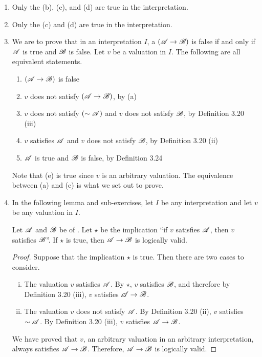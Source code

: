 \begin{enumerate}
  \item %
    Only the \wfs{} (b), (c), and (d) are true in the interpretation.

  \item %
    Only the \wfs{} (c) and (d) are true in the interpretation.

  \item %
    We are to prove that in an interpretation \(I\), a \wf{} \((\mathscr{A} \rightarrow \mathscr{B})\) is false if and only if \(\mathscr{A}\) is true and \(\mathscr{B}\) is false. Let \(v\) be a valuation in \(I\). The following are all equivalent statements.
    \begin{enumerate}[align=left]
      \item \((\mathscr{A} \rightarrow \mathscr{B})\) is false
      \item \(v\) does not satisfy \((\mathscr{A} \rightarrow \mathscr{B})\), by (a)
      \item \(v\) does not satisfy \((\sim\mathscr{A})\) and \(v\) does not satisfy \(\mathscr{B}\), by Definition 3.20 (iii)
      \item \(v\) satisfies \(\mathscr{A}\) and \(v\) does not satisfy \(\mathscr{B}\), by Definition 3.20 (ii)
      \item \(\mathscr{A}\) is true and \(\mathscr{B}\) is false, by Definition 3.24
    \end{enumerate}
    Note that (e) is true since \(v\) is an arbitrary valuation. The equivalence between (a) and (e) is what we set out to prove.

  \item %
    In the following lemma and sub-exercises, let \(I\) be any interpretation and let \(v\) be any valuation in \(I\).

    \begin{lemma*}
      Let \(\mathscr{A}\) and \(\mathscr{B}\) be \wfs{} of \cl{}. Let \(\star\) be the implication ``if \(v\) satisfies \(\mathscr{A}\), then \(v\) satisfies \(\mathscr{B}\)''. If \(\star\) is true, then \(\mathscr{A} \rightarrow \mathscr{B}\) is logically valid.

      \begin{proof}
        Suppose that the implication \(\star\) is true. Then there are two cases to consider.
        \begin{enumerate}[(i)]
          \item The valuation \(v\) satisfies \(\mathscr{A}\). By \(\star\), \(v\) satisfies \(\mathscr{B}\), and therefore by Definition 3.20 (iii), \(v\) satisfies \(\mathscr{A} \rightarrow \mathscr{B}\).
          \item The valuation \(v\) does not satisfy \(\mathscr{A}\). By Definition 3.20 (ii), \(v\) satisfies \(\sim\mathscr{A}\). By Definition 3.20 (iii), \(v\) satisfies \(\mathscr{A} \rightarrow \mathscr{B}\).
        \end{enumerate}
        We have proved that \(v\), an arbitrary valuation in an arbitrary interpretation, always satisfies \(\mathscr{A} \rightarrow \mathscr{B}\). Therefore, \(\mathscr{A} \rightarrow \mathscr{B}\) is logically valid.
      \end{proof}


\end{lemma*}
\end{enumerate}
